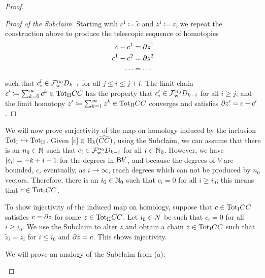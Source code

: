 \documentclass[\MainFolder/Text.tex]{subfiles}
\begin{document}
\begin{proof}
\begin{ProofList}
\begin{proof}[Proof of the Subclaim]
Starting with $c^{1} \coloneqq \tilde{c}$ and $z^{1} \coloneqq z$, we repeat the construction above to produce the telescopic sequence of homotopies
\begin{align*}
c - c^{1} & = \partial z^{1} \\
c^{1} - c^{2} & = \partial z^{2} \\
\dotsb &= \dotsb 
\end{align*}
such that $c^l_i\in \mathcal{F}^{n_0}_{\mathrm{w}} D_{k-i}$ for all $j\le i\le j+l$. The limit chain $c'\coloneqq \sum_{k=0}^{\infty} c^{k} \in {\mathrm{Tot}_{\mathrm{II}}}CC$ has the property that $c'_i \in \mathcal{F}^{n_0}_{\mathrm{w}}D_{k-i}$ for all $i\ge j$, and the limit homotopy $z' \coloneqq \sum_{k=1}^\infty z^k \in {\mathrm{Tot}_{\mathrm{II}}} CC$ converges and satisfies $\partial z' = c-c'$.
\end{proof}

We will now prove surjectivity of the map on homology induced by the inclusion ${\mathrm{Tot}_{\mathrm{I}}} \hookrightarrow {\mathrm{Tot}_{\mathrm{II}}}$. Given $[c]\in \mathrm{H}_k(\widehat{CC})$, using the Subclaim, we can assume that there is an $n_0\in\mathbb{N}$ such that $c_i\in \mathcal{F}^{n_0}_{\mathrm{w}}D_{k-i}$ for all $i\in\mathbb{N}_0$. However, we have $|c_i| = -k+i-1$ for the degrees in $\mathrm{B} V$, and because the degrees of $V$ are bounded, $c_i$ eventually, as $i\to \infty$, reach degrees which can not be produced by $n_0$ vectors. Therefore, there is an $i_0\in \mathbb{N}_0$ such that $c_i = 0$ for all $i\ge i_0$; this means that $c \in {\mathrm{Tot}_{\mathrm{I}}} CC$.

To show injectivity of the induced map on homology, suppose that $c\in {\mathrm{Tot}_{\mathrm{I}}} CC$ satisfies $c=\partial z$ for some $z\in {\mathrm{Tot}_{\mathrm{II}}} CC$. Let $i_0\in N$ be such that $c_i = 0$ for all $i\ge i_0$. We use the Subclaim to alter $z$ and obtain a chain $\tilde{z}\in{\mathrm{Tot}_{\mathrm{I}}} CC$ such that $\tilde{z}_{i} = z_i$ for $i\le i_0$ and $\partial \tilde{z} = c$. This shows injectivity.

\item We will prove an analogy of the Subclaim from (a):


\end{ProofList}
\end{proof}
\end{document}
